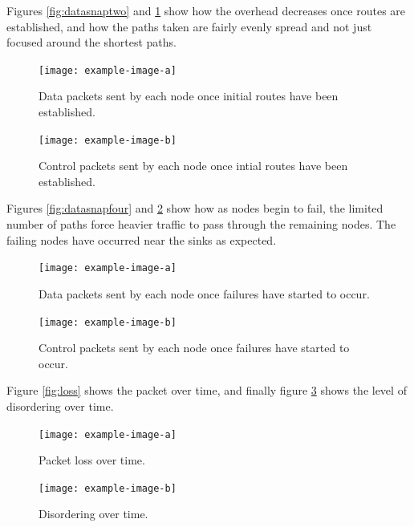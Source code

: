 \documentclass[12pt]{article}
\begin{document}
Figures \ref{fig:datasnaptwo} and \ref{fig:ctrlsnaptwo} show how the overhead decreases once routes are established, and how the paths taken are fairly evenly spread and not just focused around the shortest paths. 

\begin{figure}[!ht]
    \centering
    \begin{minipage}{0.45\textwidth}
        \centering
        \texttt{[image: example-image-a]} %
        \caption{Data packets sent by each node once initial routes have been established.}
        \label{fig:datasnaptwo}
    \end{minipage}\hfill
    \begin{minipage}{0.45\textwidth}
        \centering
       \texttt{[image: example-image-b]} %
        \caption{Control packets sent by each node once intial routes have been established.}
        \label{fig:ctrlsnaptwo}
    \end{minipage}
\end{figure}

Figures \ref{fig:datasnapfour} and \ref{fig:ctrlsnapfour} show how as nodes begin to fail, the limited number of paths force heavier traffic to pass through the remaining nodes. The failing nodes have occurred near the sinks as expected.

\begin{figure}[!ht]
    \centering
    \begin{minipage}{0.45\textwidth}
        \centering
        \texttt{[image: example-image-a]} %
        \caption{Data packets sent by each node once failures have started to occur.}
        \label{fig:datasnapfour}
    \end{minipage}\hfill
    \begin{minipage}{0.45\textwidth}
        \centering
        \texttt{[image: example-image-b]} %
        \caption{Control packets sent by each node once failures have started to occur.}
        \label{fig:ctrlsnapfour}
    \end{minipage}
\end{figure}

Figure \ref{fig:loss} shows the packet over time, and finally figure \ref{fig:dis} shows the level of disordering over time.

\begin{figure}[!ht]
    \centering
    \begin{minipage}{0.45\textwidth}
        \centering
        \texttt{[image: example-image-a]} %
        \caption{Packet loss over time.}
        \label{fig:loss}
    \end{minipage}\hfill
    \begin{minipage}{0.45\textwidth}
        \centering
        \texttt{[image: example-image-b]} %
        \caption{Disordering over time.}
        \label{fig:dis}
    \end{minipage}\hfill
\end{figure}
\end{document}
